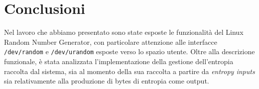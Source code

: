 \documentclass{article}
\begin{document}
 
 
 \section*{Conclusioni}
 Nel lavoro che abbiamo presentato sono state esposte le funzionalità del Linux
 Random Number Generator, con particolare attenzione alle interfacce
 \verb+/dev/random+ e \verb+/dev/urandom+ esposte verso lo spazio utente.
 Oltre alla descrizione funzionale, è stata analizzata l'implementazione della
 gestione dell'entropia raccolta dal sistema, sia al momento della sua raccolta
 a partire da \emph{entropy inputs} sia relativamente alla produzione di bytes
 di entropia come output.
 
   
   
\end{document}
